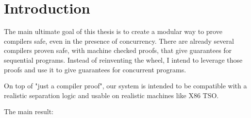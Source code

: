 
\chapter{Introduction\label{ch:intro}}

The main ultimate goal of this thesis is to create a modular way to prove compilers safe, even in the presence of concurrency. There are already several compilers proven safe, with machine checked proofs, that give guarantees for sequential programs. Instead of reinventing the wheel, I intend to leverage those proofs and use it to give guarantees for concurrent programs.

On top of "just a compiler proof", our system is intended to be compatible with a realistic separation logic and usable on realistic machines like X86 TSO.

The main result:





